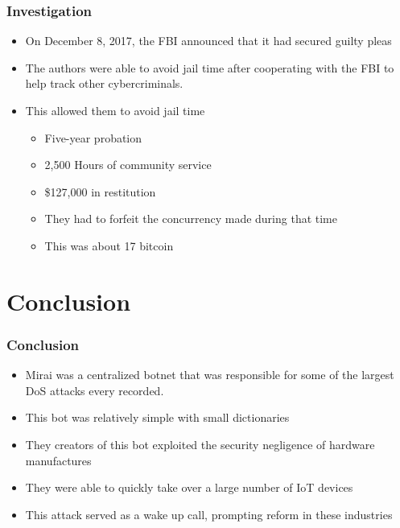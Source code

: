 \documentclass{beamer}
\begin{document}
\begin{frame}
	\frametitle{Investigation}
	\begin{itemize}
		\item<+-> On December 8, 2017, the FBI announced that it had secured guilty pleas
		\item<+-> The authors were able to avoid jail time after cooperating with the FBI to help track other cybercriminals.
		\item<+-> This allowed them to avoid jail time
		\begin{itemize}
			\item<+-> Five-year probation
			\item<+-> 2,500 Hours of community service
			\item<+-> \$127,000 in restitution
			\item<+-> They had to forfeit the concurrency made during that time
			\item<+-> This was about 17 bitcoin
		\end{itemize}
	\end{itemize}
\end{frame}

\section{Conclusion}

\begin{frame}
	\frametitle{Conclusion}
	\begin{itemize}
		\item<+-> Mirai was a centralized botnet that was responsible for some of the largest DoS attacks every recorded.
		\item<+-> This bot was relatively simple with small dictionaries
		\item<+-> They creators of this bot exploited the security negligence of hardware manufactures
		\item<+-> They were able to quickly take over a large number of IoT devices
		\item<+-> This attack served as a wake up call, prompting reform in these industries
	\end{itemize}
\end{frame}
\end{document}
